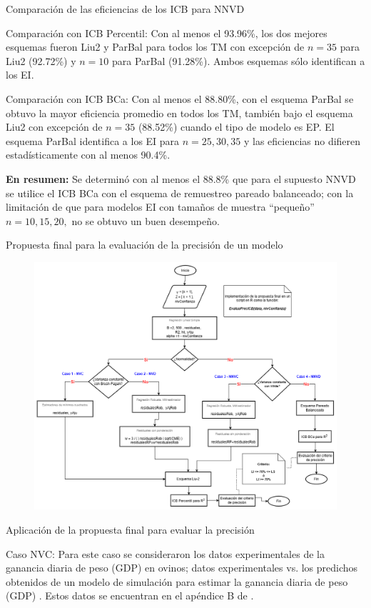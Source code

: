 \documentclass[serif, aspectratio=169]{beamer}
\begin{document}
\begin{frame}{Comparación de las eficiencias de los ICB para NNVD}
	\begin{exampleblock}{Comparación con ICB Percentil:}
	Con al menos el 93.96\%, los dos mejores esquemas fueron Liu2 y ParBal para todos los TM con excepción de $n=35$ para Liu2 (92.72\%) y $n=10$ para ParBal (91.28\%). Ambos esquemas sólo identifican a los EI.
	\end{exampleblock}
	
	\begin{exampleblock}{Comparación con ICB BCa:}
	Con al menos el 88.80\%, con el esquema ParBal se obtuvo la mayor eficiencia promedio en todos los TM, también bajo el esquema Liu2 con excepción de $n=35$ (88.52\%) cuando el tipo de modelo es EP. El esquema ParBal identifica a los EI para $n= 25, 30, 35$ y las eficiencias no difieren estadísticamente con al menos 90.4\%.
	\vspace{.1cm}
	
	\textbf{En resumen:}
	Se determinó con al menos el 88.8\% que para el supuesto NNVD se utilice el ICB BCa con el esquema de remuestreo pareado balanceado; con la limitación de que para modelos EI con tamaños de muestra “pequeño” $n=10, 15, 20,$ no se obtuvo un buen desempeño.
	\end{exampleblock}
\end{frame}


\begin{frame}{Propuesta final para la evaluación de la precisión de un modelo}
	\begin{figure}[ht] 
		\centering 
		\includegraphics[width=0.62\linewidth]{recurso/metodoPresent_v10.png} 
		\label{fig:finalPropuesta}
	\end{figure}
\end{frame}


\begin{frame}{Aplicación de la propuesta final para evaluar la precisión}
	\begin{exampleblock}{Caso NVC:}
		Para este caso se consideraron los datos experimentales de la ganancia diaria de peso (GDP) en ovinos; datos experimentales vs. los predichos obtenidos de un modelo de simulación para estimar la ganancia diaria de peso (GDP) \parencite{osorio-2011}. Estos datos se encuentran en el apéndice B de \textcite{balam-2012}.
	\end{exampleblock}
\end{frame}
\end{document}
